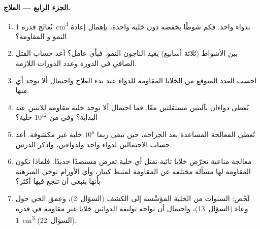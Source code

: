 \begin{problem}
\medskip
\noindent\textbf{الجزء الرابع --- العلاج.}
\begin{enumerate}[resume]
  \item يُعالج  قدره \qty{1}{cm^3} بدواء واحد. فكم
        شوطًا يخفضه دون خلية واحدة، بإهمال إعادة النمو و
        المقاومة؟
  \item بين الأشواط (ثلاثة أسابيع) يعيد الناجون النمو. فبأي
        عامل؟ أعد حساب القتل الصافي في الدورة وعدد
        الدورات اللازمة.
  \item احسب العدد المتوقع من الخلايا المقاومة للدواء عند
        بدء العلاج واحتمال ألا توجد أي منها.
  \item يُعطى دواءان بآليتين مستقلتين معًا.
        فما احتمال ألا توجد خلية مقاومة للاثنين عند البداية؟
        وفي  من $10^{12}$ خلية؟
  \item تُعطى المعالجة المساعدة بعد الجراحة، حين تبقى ربما $10^{6}$
        خلية غير مكشوفة. أعد حساب الاحتمالين لدواء واحد
        ولدواءين، واذكر الدرس.
  \item معالجة مناعية تحرّض خلايا تائية تقتل أي خلية تعرض
        مستضدًا جديدًا. فلماذا تكون المقاومة لها مسألة مختلفة عن
        المقاومة لمثبط كيناز، وأي الأورام توحي المبرهنة بأنها
        ينبغي أن تنجع فيها أكثر؟
  \item لخّص: السنوات من الخلية المؤسِّسة إلى الكشف
        (السؤال~2)، وعمق  الحي حول وعاء
        (السؤال~13)، واحتمال أن تواجه توليفة الدوائين
        خلايا غير مقاومة في  قدره \qty{1}{cm^3}
        (السؤال~22).
\end{enumerate}
\end{problem}
